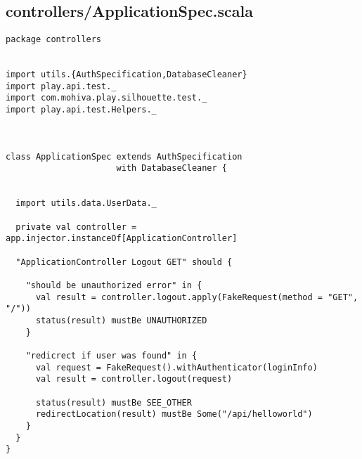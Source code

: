 \subsection{controllers/ApplicationSpec.scala}
\begin{lstlisting}
package controllers


import utils.{AuthSpecification,DatabaseCleaner}
import play.api.test._
import com.mohiva.play.silhouette.test._
import play.api.test.Helpers._



class ApplicationSpec extends AuthSpecification
                      with DatabaseCleaner {


  import utils.data.UserData._

  private val controller = app.injector.instanceOf[ApplicationController]

  "ApplicationController Logout GET" should {

    "should be unauthorized error" in {
      val result = controller.logout.apply(FakeRequest(method = "GET", "/"))
      status(result) mustBe UNAUTHORIZED
    }

    "redicrect if user was found" in {
      val request = FakeRequest().withAuthenticator(loginInfo)
      val result = controller.logout(request)

      status(result) mustBe SEE_OTHER
      redirectLocation(result) mustBe Some("/api/helloworld")
    }
  }
}
\end{lstlisting}
